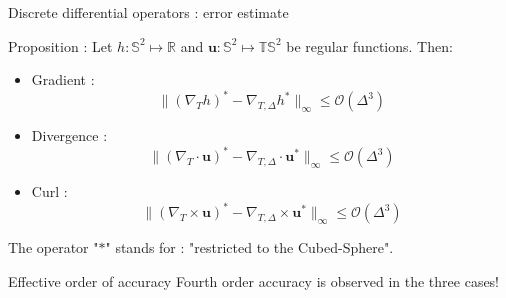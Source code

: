 \documentclass[11pt]{beamer}
\begin{document}
\begin{frame}{Discrete differential operators : error estimate}
\begin{block}{Proposition :}
Let $h:\mathbb{S}^2 \mapsto \mathbb{R}$ and $\mathbf{u}: \mathbb{S}^2 \mapsto \mathbb{T}\mathbb{S}^2$ be regular functions. Then:
\begin{itemize}
\item Gradient : \begin{equation}
\| (\nabla_{T}h)^* - \nabla_{T,\Delta}h^* \|_{\infty} \leq \mathcal{O} \left( \Delta^3 \right)
\end{equation}
\item Divergence : \begin{equation}
\| (\nabla_{T}\cdot \mathbf{u})^* - \nabla_{T,\Delta}\cdot \mathbf{u}^* \|_{\infty} \leq \mathcal{O} \left( \Delta^3 \right)
\end{equation}
\item Curl : \begin{equation}
\| (\nabla_{T}\times \mathbf{u})^* - \nabla_{T,\Delta}\times \mathbf{u}^* \|_{\infty}  \leq  \mathcal{O} \left( \Delta^3 \right)
\end{equation}
\end{itemize}
The operator "$*$" stands for : "restricted to the Cubed-Sphere".
\end{block}
\begin{block}{Effective order of accuracy}
Fourth order accuracy is observed in the three cases!
\end{block}
\end{frame}


%
\end{document}
